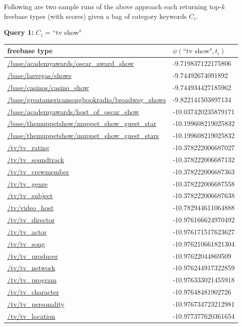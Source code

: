\documentclass[a4paper, twoside, 12pt]{report}
\begin{document}
Following are two sample runs of the above approach each returning top-$k$ freebase types (with scores) given a bag of category keywords $C_i$.

\textbf{Query 1:} $C_i$ = ``tv show"
\begin{longtable}{| p{} | p{} |}
\hline
\textbf{freebase type} & $\psi(\text{``tv show"}, t_i)$ \\ \hline \hline

\url{/base/academyawards/oscar_award_show} & -9.719837122175806 \\ \hline
\url{/base/lasvegas/shows} & -9.74492674091892 \\ \hline
\url{/base/casinos/casino_show} & -9.744934427185962 \\ \hline
\url{/base/greatamericansongbookradio/broadway_shows} & -9.822141503897134 \\ \hline
\url{/base/academyawards/host_of_oscar_show} & -10.037420235879171 \\ \hline
\url{/base/themuppetshow/muppet_show_guest_star} & -10.199608219025832 \\ \hline
\url{/base/themuppetshow/muppet_show_guest_stars} & -10.199608219025832 \\ \hline
\url{/tv/tv_rating} & -10.378222006687027 \\ \hline
\url{/tv/tv_soundtrack} & -10.378222006687132 \\ \hline
\url{/tv/tv_crewmember} & -10.378222006687363 \\ \hline
\url{/tv/tv_genre} & -10.378222006687558 \\ \hline
\url{/tv/tv_subject} & -10.378222006687638 \\ \hline
\url{/tv/video_host} & -10.782944611064888 \\ \hline
\url{/tv/tv_director} & -10.976166624970492 \\ \hline
\url{/tv/tv_actor} & -10.976171517623627 \\ \hline
\url{/tv/tv_song} & -10.976210661821304 \\ \hline
\url{/tv/tv_producer} & -10.97622044869509 \\ \hline
\url{/tv/tv_network} & -10.976244917322859 \\ \hline
\url{/tv/tv_program} & -10.976333021455918 \\ \hline
\url{/tv/tv_character} & -10.97648481902726 \\ \hline
\url{/tv/tv_personality} & -10.976734723212981 \\ \hline
\url{/tv/tv_location} & -10.977377620361654 \\ \hline

\end{longtable}
\end{document}
